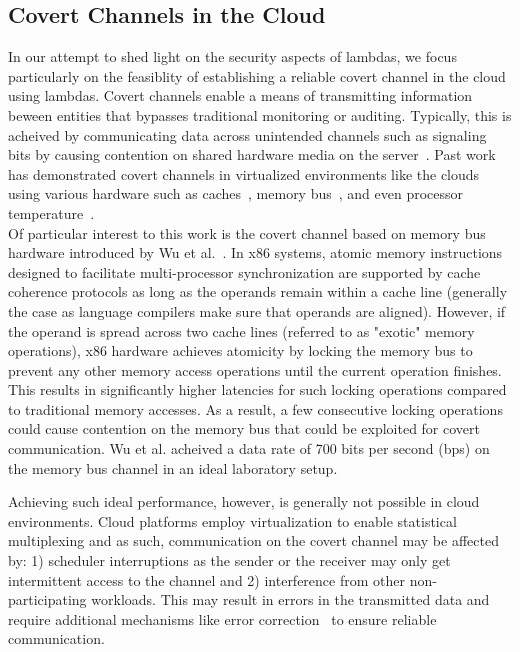 \subsection{Covert Channels in the Cloud}
\label{sec:background:covertchannels}
In our attempt to shed light on the security aspects of lambdas, we focus
particularly on the feasiblity of establishing a reliable covert channel in the
cloud using lambdas.  Covert channels enable a means of transmitting information
beween entities that bypasses traditional monitoring or auditing. Typically,
this is acheived by communicating data across unintended channels such as
signaling bits by causing contention on shared hardware media on the
server~\cite{L2cacheCovertChannels,
ProcessorCovertChannels,ThermalCovertChannel,SshOverCovertChannel,wuusenix2012}.
Past work has demonstrated covert channels in virtualized environments like the
clouds using various hardware such as
caches~\cite{ristenpartccs2009,L2cacheCovertChannels}, memory
bus~\cite{wuusenix2012}, and even processor
temperature~\cite{ThermalCovertChannel}. \\

Of particular interest to this work is the covert channel based on memory bus
hardware introduced by Wu et al.~\cite{wuusenix2012}.  In x86 systems, atomic
memory instructions designed to facilitate multi-processor synchronization are
supported by cache coherence protocols as long as the operands remain within a
cache line (generally the case as language compilers make sure that operands are
aligned). However, if the operand is spread across two cache lines (referred to
as "exotic" memory operations), x86 hardware achieves atomicity by locking the
memory bus to prevent any other memory access operations until the current
operation finishes. This results in significantly higher latencies for such
locking operations compared to traditional memory accesses. As a result, a few
consecutive locking operations could cause contention on the memory bus that
could be exploited for covert communication.  Wu et al. acheived a data rate of
700 bits per second (bps) on the memory bus channel in an ideal laboratory
setup.

Achieving such ideal performance, however, is generally not possible in cloud 
environments. Cloud platforms employ virtualization to enable statistical 
multiplexing and as such, communication on the covert channel may be affected by:
1) scheduler interruptions as the sender or the receiver may only get intermittent 
access to the channel and 2) interference from other non-participating
workloads. This may result in errors in the transmitted data and require 
additional mechanisms like error correction~\cite{wuusenix2012} to ensure
reliable communication.


